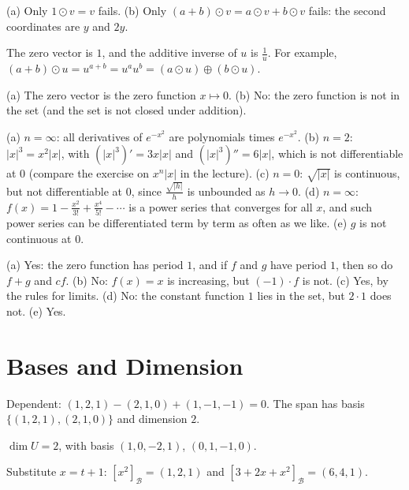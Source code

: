\documentclass[11pt]{article}
\begin{document}
\begin{description}[leftmargin=0pt, itemsep=0.3em]
    \item[\ref{pr:weird-ops}.] (a) Only $1 \odot v = v$ fails. (b) Only $(a + b) \odot v = a \odot v + b \odot v$ fails: the second coordinates are $y$ and $2y$.
    \item[\ref{pr:positive-reals}.] The zero vector is $1$, and the additive inverse of $u$ is $\frac{1}{u}$. For example, $(a + b) \odot u = u^{a + b} = u^a u^b = (a \odot u) \oplus (b \odot u)$.
    \item[\ref{pr:functions}.] (a) The zero vector is the zero function $x \mapsto 0$. (b) No: the zero function is not in the set (and the set is not closed under addition).
    \item[\ref{pr:Cn-membership}.] (a) $n = \infty$: all derivatives of $e^{-x^2}$ are polynomials times $e^{-x^2}$. (b) $n = 2$: $|x|^3 = x^2|x|$, with $(|x|^3)' = 3x|x|$ and $(|x|^3)'' = 6|x|$, which is not differentiable at $0$ (compare the exercise on $x^n|x|$ in the lecture). (c) $n = 0$: $\sqrt{|x|}$ is continuous, but not differentiable at $0$, since $\frac{\sqrt{|h|}}{h}$ is unbounded as $h \to 0$. (d) $n = \infty$: $f(x) = 1 - \frac{x^2}{3!} + \frac{x^4}{5!} - \cdots$ is a power series that converges for all $x$, and such power series can be differentiated term by term as often as we like. (e) $g$ is not continuous at $0$.
    \item[\ref{pr:fn-sets}.] (a) Yes: the zero function has period $1$, and if $f$ and $g$ have period $1$, then so do $f + g$ and $cf$. (b) No: $f(x) = x$ is increasing, but $(-1) \cdot f$ is not. (c) Yes, by the rules for limits. (d) No: the constant function $1$ lies in the set, but $2 \cdot 1$ does not. (e) Yes.
\end{description}

\section*{Bases and Dimension}

\begin{description}[leftmargin=0pt, itemsep=0.3em]
    \item[\ref{pr:indep}.] Dependent: $(1, 2, 1) - (2, 1, 0) + (1, -1, -1) = 0$. The span has basis $\{(1, 2, 1), (2, 1, 0)\}$ and dimension $2$.
    \item[\ref{pr:basisU}.] $\dim U = 2$, with basis $(1, 0, -2, 1)$, $(0, 1, -1, 0)$.
    \item[\ref{pr:taylor-basis}.] Substitute $x = t + 1$: $[x^2]_{\mathcal{B}} = (1, 2, 1)$ and $[3 + 2x + x^2]_{\mathcal{B}} = (6, 4, 1)$.
\end{description}
\end{document}
